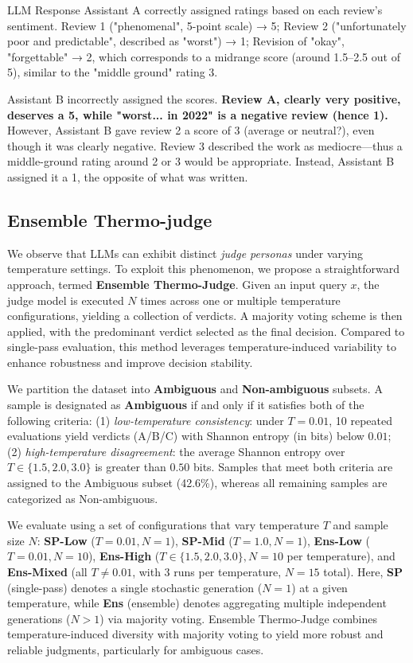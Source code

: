 \documentclass[11pt]{article}
\begin{document}
\begin{responsebox}{LLM Response}
Assistant A correctly assigned ratings based on each review's sentiment. 
Review 1 ("phenomenal", 5-point scale) → 5; 
Review 2 ("unfortunately poor and predictable", described as "worst") → 1; 
Revision of "okay", "forgettable" → 2, which corresponds to a midrange score (around 1.5–2.5 out of 5),
similar to the "middle ground" rating 3. 

Assistant B incorrectly assigned the scores. 
\textbf{Review A, clearly very positive, deserves a 5, while "worst... in 2022" is a negative review (hence 1).} 
However, Assistant B gave review 2 a score of 3 (average or neutral?), even though it was clearly negative. 
Review 3 described the work as mediocre—thus a middle-ground rating around 2 or 3 would be appropriate. 
Instead, Assistant B assigned it a 1, the opposite of what was written.
\end{responsebox}


\subsection{Ensemble Thermo-judge}

We observe that LLMs can exhibit distinct \textit{judge personas} under varying temperature settings. To exploit this phenomenon, we propose a straightforward approach, termed \textbf{Ensemble Thermo-Judge}. Given an input query $x$, the judge model is executed $N$ times across one or multiple temperature configurations, yielding a collection of verdicts. A majority voting scheme is then applied, with the predominant verdict selected as the final decision. Compared to single-pass evaluation, this method leverages temperature-induced variability to enhance robustness and improve decision stability.

We partition the dataset into \textbf{Ambiguous} and \textbf{Non-ambiguous} subsets. A sample is designated as \textbf{Ambiguous} if and only if it satisfies both of the following criteria:
(1) \textit{low-temperature consistency}: under $T = 0.01$, 10 repeated evaluations yield verdicts (A/B/C) with Shannon entropy (in bits) below $0.01$;
(2) \textit{high-temperature disagreement}: the average Shannon entropy over $T \in \{1.5, 2.0, 3.0\}$ is greater than $0.50$ bits.
Samples that meet both criteria are assigned to the Ambiguous subset (42.6\%), whereas all remaining samples are categorized as Non-ambiguous.

We evaluate using a set of configurations that vary temperature \(T\) and sample size \(N\): \textbf{SP-Low} (\(T{=}0.01, N{=}1\)), \textbf{SP-Mid} (\(T{=}1.0, N{=}1\)), \textbf{Ens-Low} (\(T{=}0.01, N{=}10\)), \textbf{Ens-High} (\(T \in \{1.5, 2.0, 3.0\}, N{=}10\) per temperature), and \textbf{Ens-Mixed} (all \(T \neq 0.01\), with 3 runs per temperature, \(N{=}15\) total). Here, \textbf{SP} (single-pass) denotes a single stochastic generation (\(N=1\)) at a given temperature, while \textbf{Ens} (ensemble) denotes aggregating multiple independent generations (\(N>1\)) via majority voting. Ensemble Thermo-Judge combines temperature-induced diversity with majority voting to yield more robust and reliable judgments, particularly for ambiguous cases.
\end{document}
